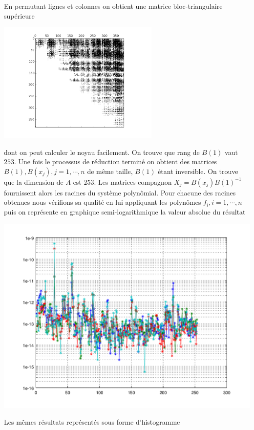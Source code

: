 \documentclass{standalone}
\begin{document}
  En permutant lignes et colonnes on obtient une matrice bloc-triangulaire supérieure
   \begin{center}
  \includegraphics[width=8cm]{../png/B0_tri.png}
  \end{center}
  dont on peut calculer le noyau facilement. On trouve que rang de $B(1)$ vaut $253$.
  Une fois le processus de réduction terminé on obtient des matrices $B(1), B(x_j), j=1,\cdots,n$ de même taille, $B(1)$ étant inversible. On trouve que la dimension de $A$ est $253$. Les matrices compagnon $X_j = B(x_j)B(1)^{-1}$ fournissent alors les racines du système polynômial. Pour chacune des racines obtenues nous vérifions sa qualité en lui appliquant les polynômes $f_i, i=1,\cdots,n$ puis on représente en graphique semi-logarithmique la  valeur absolue du résultat
   \begin{center}
  \includegraphics[height=10cm, width=18cm]{../png/f_rac.png}
  \end{center}
  Les mêmes résultats représentés sous forme d'histogramme
\end{document}
